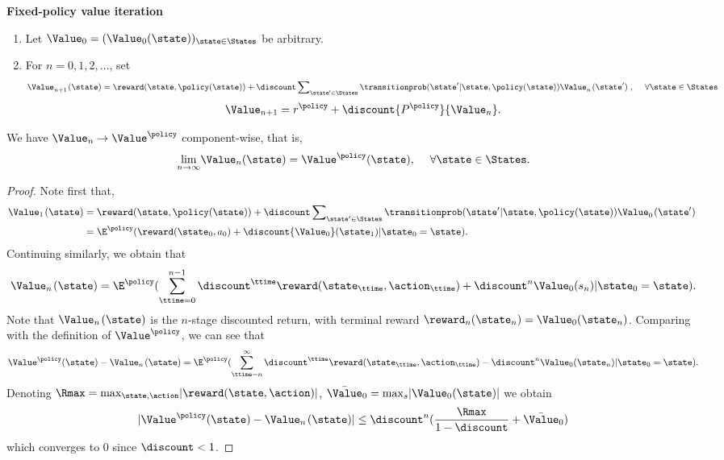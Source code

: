 \begin{algorithm_}\textbf{Fixed-policy value iteration}
\begin{enumerate}
  \item Let ${\Value_0} = {({\Value_0}(\state))_{\state \in \States}}$ be arbitrary.
  \item For $n = 0,1,2, \ldots $, set
\[\Value_{n + 1}^{}{\kern 1pt} (\state) = \reward(\state,\policy (\state)) + \discount \sum\nolimits_{\state' \in \States} {\transitionprob(\state'|\state,\policy (\state))\Value_n^{}{\kern 1pt} (\state')} \;,\quad \;\forall \state \in \States\]
\[{\Value_{n + 1}} = {r^\policy } + \discount {P^\policy }{\Value_n}.\]
\end{enumerate}
\end{algorithm_}

\begin{proposition}\label{prop:FP_VI}
We have ${\Value_n} \to \Value_{}^\policy$ component-wise, that is,
\[{\lim _{n \to \infty }}{\Value_n}(\state) = \Value_{}^\policy (\state),\quad \;\forall \state \in \States.\]
\end{proposition}
\begin{proof}
Note first that,
\begin{align*}
{\Value_1}{\kern 1pt} (\state) &= \reward(\state,\policy (\state)) + \discount \sum\nolimits_{\state' \in \States} {\transitionprob(\state'|\state,\policy (\state))\Value_0^{}{\kern 1pt} (\state')} \;\\
 &= {\E^\policy }(\reward({\state_0},{a_0}) + \discount {\Value_0}({\state_1})|{\state_0} = \state).
\end{align*}
Continuing similarly, we obtain that
\[{\Value_n}{\kern 1pt} (\state) = {\E^\policy }(\sum\limits_{\ttime = 0}^{n - 1} {{\discount ^\ttime}\reward({\state_\ttime},{\action_\ttime})}  + {\discount ^n}{\Value_0}({s_n})|{\state_0} = \state).\]
Note that ${\Value_n}{\kern 1pt} (\state)$ is the $n$-stage
discounted return, with terminal reward ${\reward_n}({\state_n}) =
{\Value_0}({\state_n})$. Comparing with the definition of
$\Value_{}^\policy $, we can see that
\[{\Value^\policy }(\state) - {\Value_n}{\kern 1pt} (\state) = {\E^\policy }(\sum\limits_{\ttime = n}^\infty  {{\discount ^\ttime}\reward({\state_\ttime},{\action_\ttime})}  - {\discount ^n}{\Value_0}({\state_n})|{\state_0} = \state).\]
Denoting $\Rmax = {\max
_{\state,\action}}|\reward(\state,\action)|$, ${\bar \Value_0} =
{\max _s}|\Value_0(\state)|$ we obtain
\[|{\Value^\policy }(\state) - {\Value_n}{\kern 1pt} (\state)| \le {\discount ^n}(\frac{{\Rmax}}{{1 - \discount }} + {\bar \Value_0})\]
which converges to 0 since $\discount  < 1$.
\end{proof}

